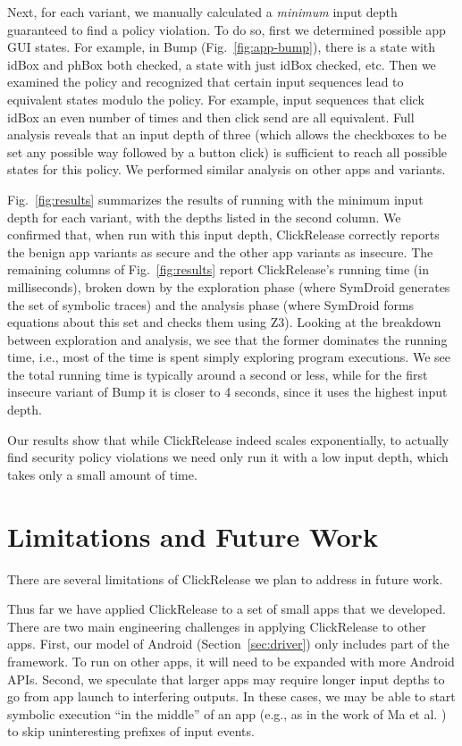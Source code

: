 \documentclass{llncs}
\newcommand{\code}[1]{\textsf{#1}} %
\newcommand{\toolname}{ClickRelease\xspace}
\begin{document}
Next, for each variant, we manually
calculated a \emph{minimum} input depth guaranteed
to find a policy violation.
To do so, first we determined possible app GUI states.
For example, in Bump (Fig.~\ref{fig:app-bump}), there is a state with \code{idBox} and
\code{phBox} both checked, a state with just \code{idBox} checked,
etc. Then we examined the policy and recognized that certain input
sequences lead to equivalent states modulo the policy.  For example,
input sequences that click \code{idBox} an even number of times and
then click send are all equivalent. Full analysis reveals that an
input depth of three (which allows the checkboxes to be set any
possible way followed by a button click) is
sufficient to reach all possible states for this policy. We performed
similar analysis on other apps and variants.

Fig.~\ref{fig:results} summarizes the results of running with
the minimum input depth for each variant, with the depths listed in
the second column.
We confirmed that, when run with this input depth, \toolname{}
correctly reports the benign app variants as secure and the other app
variants as insecure.
%
The remaining columns of Fig.~\ref{fig:results} report \toolname{}'s
running time (in milliseconds), broken down by the
exploration phase (where SymDroid generates the set of symbolic
traces) and the analysis phase (where SymDroid forms equations about
this set and checks them using Z3).  Looking at the breakdown between
exploration and analysis, we see that the former dominates the running
time, i.e., most of the time is spent simply exploring program
executions.  We see the total running time is typically around a
second or less, while for the first insecure variant of Bump it is
closer to 4 seconds, since it uses the highest input depth.

Our results show that while \toolname{} indeed scales exponentially,
to actually find security policy violations we need only run it with a
low input depth, which takes only a small amount of time.

\section{Limitations and Future Work}

There are several limitations of \toolname{} we plan to address
in future work.

Thus far we have applied \toolname{} to a set of small apps that we
developed. There are two main engineering challenges in applying
\toolname{} to other apps. First, our
model of Android (Section~\ref{sec:driver}) only includes part of the
framework. To run on other apps, it will need to be expanded
with more Android APIs. 
Second, we speculate
that larger apps may require longer input depths to go from app launch
to interfering outputs. In these cases, we may be able to start
symbolic execution ``in the middle'' of an app (e.g., as in the
work of Ma et al. \cite{Ma:2011}) to skip uninteresting
prefixes of input events.
\end{document}
